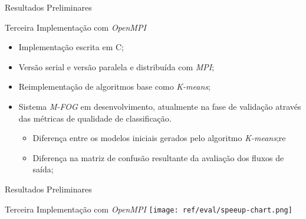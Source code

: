 \documentclass[aspectratio=43,10pt]{beamer}
\begin{document}
\begin{frame}[fragile]{Resultados Preliminares}
  \begin{alertblock}{Terceira Implementação com \textit{OpenMPI}}
    \begin{itemize}%
      \item Implementação escrita em C;
      \item Versão serial e versão paralela e distribuída com \textit{MPI};
      \item Reimplementação de algoritmos base como \textit{K-means};
      \item Sistema \textit{M-FOG} em desenvolvimento, atualmente na fase de
      validação através das métricas de qualidade de classificação.
      \begin{itemize}
        \item Diferença entre os modelos iniciais gerados pelo algoritmo \textit{K-means};re
        \item Diferença na matriz de confusão resultante da avaliação dos fluxos de saída;
      \end{itemize}
    \end{itemize}
  \end{alertblock}
\end{frame}

\begin{frame}[fragile]{Resultados Preliminares}
  \begin{alertblock}{Terceira Implementação com \textit{OpenMPI}}
    \texttt{[image: ref/eval/speeup-chart.png]}
  \end{alertblock}
\end{frame}
\end{document}
